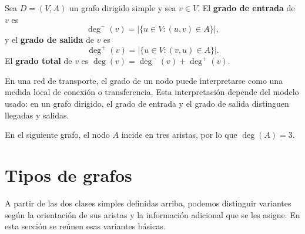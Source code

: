         \begin{definicion}
            Sea $D=(V,A)$ un grafo dirigido simple y sea $v\in V$. El \textbf{grado de entrada} de $v$ es
            \[
                \deg^{-}(v)=|\{u\in V:(u,v)\in A\}|,
            \]
            y el \textbf{grado de salida} de $v$ es
            \[
                \deg^{+}(v)=|\{u\in V:(v,u)\in A\}|.
            \]
            El \textbf{grado total} de $v$ es $\deg(v)=\deg^{-}(v)+\deg^{+}(v)$.
        \end{definicion}

        \begin{observacion}
            En una red de transporte, el grado de un nodo puede interpretarse como una medida local de conexión o transferencia. Esta interpretación depende del modelo usado: en un grafo dirigido, el grado de entrada y el grado de salida distinguen llegadas y salidas.
        \end{observacion}

        \begin{ejemplo}
            En el siguiente grafo, el nodo $A$ incide en tres aristas, por lo que $\deg(A)=3$.

            \begin{center}
            \end{center}
        \end{ejemplo}

    \section{Tipos de grafos}

        A partir de las dos clases simples definidas arriba, podemos distinguir variantes según la orientación de sus aristas y la información adicional que se les asigne. En esta sección se reúnen esas variantes básicas.

